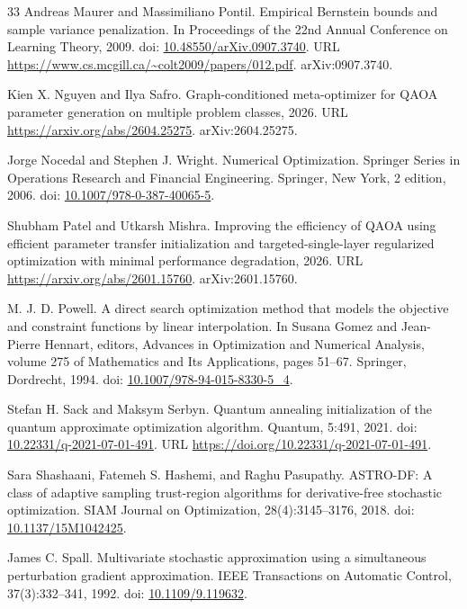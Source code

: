\documentclass[11pt]{article}
\begin{document}
\begin{thebibliography}{33}
Andreas Maurer and Massimiliano Pontil. Empirical Bernstein bounds and sample variance penalization. In Proceedings of the 22nd Annual Conference on Learning Theory, 2009. doi: \href{https://doi.org/10.48550/arXiv.0907.3740}{10.48550/arXiv.0907.3740}. URL \url{https://www.cs.mcgill.ca/~colt2009/papers/012.pdf}. arXiv:0907.3740.

Kien X. Nguyen and Ilya Safro. Graph-conditioned meta-optimizer for QAOA parameter generation on multiple problem classes, 2026. URL \url{https://arxiv.org/abs/2604.25275}. arXiv:2604.25275.

Jorge Nocedal and Stephen J. Wright. Numerical Optimization. Springer Series in Operations Research and Financial Engineering. Springer, New York, 2 edition, 2006. doi: \href{https://doi.org/10.1007/978-0-387-40065-5}{10.1007/978-0-387-40065-5}.

Shubham Patel and Utkarsh Mishra. Improving the efficiency of QAOA using efficient parameter transfer initialization and targeted-single-layer regularized optimization with minimal performance degradation, 2026. URL \url{https://arxiv.org/abs/2601.15760}. arXiv:2601.15760.

M. J. D. Powell. A direct search optimization method that models the objective and constraint functions by linear interpolation. In Susana Gomez and Jean-Pierre Hennart, editors, Advances in Optimization and Numerical Analysis, volume 275 of Mathematics and Its Applications, pages 51--67. Springer, Dordrecht, 1994. doi: \href{https://doi.org/10.1007/978-94-015-8330-5\_4}{10.1007/978-94-015-8330-5\_4}.

Stefan H. Sack and Maksym Serbyn. Quantum annealing initialization of the quantum approximate optimization algorithm. Quantum, 5:491, 2021. doi: \href{https://doi.org/10.22331/q-2021-07-01-491}{10.22331/q-2021-07-01-491}. URL \url{https://doi.org/10.22331/q-2021-07-01-491}.

Sara Shashaani, Fatemeh S. Hashemi, and Raghu Pasupathy. ASTRO-DF: A class of adaptive sampling trust-region algorithms for derivative-free stochastic optimization. SIAM Journal on Optimization, 28(4):3145--3176, 2018. doi: \href{https://doi.org/10.1137/15M1042425}{10.1137/15M1042425}.

James C. Spall. Multivariate stochastic approximation using a simultaneous perturbation gradient approximation. IEEE Transactions on Automatic Control, 37(3):332--341, 1992. doi: \href{https://doi.org/10.1109/9.119632}{10.1109/9.119632}.


\end{thebibliography}
\end{document}
